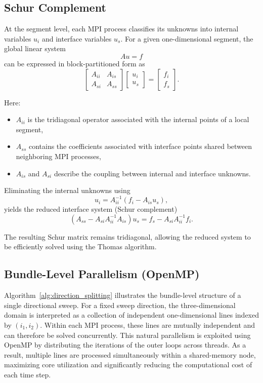 \documentclass[12pt]{article}
\begin{document}
\subsection{Schur Complement}

At the segment level, each MPI process classifies its unknowns into internal variables $u_i$ and interface variables $u_s$. For a given one-dimensional segment, the global linear system
\[
Au = f
\]
can be expressed in block-partitioned form as
\begin{equation}
    \begin{bmatrix}
        A_{ii} & A_{is} \\
        A_{si} & A_{ss}
    \end{bmatrix}
    \begin{bmatrix}
        u_i \\
        u_s
    \end{bmatrix}
    =
    \begin{bmatrix}
        f_i \\
        f_s
    \end{bmatrix}.
\end{equation}

Here:
\begin{itemize}
    \item $A_{ii}$ is the tridiagonal operator associated with the internal points of a local segment,
    \item $A_{ss}$ contains the coefficients associated with interface points shared between neighboring MPI processes,
    \item $A_{is}$ and $A_{si}$ describe the coupling between internal and interface unknowns.
\end{itemize}

Eliminating the internal unknowns using
\[
u_i = A_{ii}^{-1}(f_i - A_{is}u_s),
\]
yields the reduced interface system (Schur complement)
\begin{equation}
    (A_{ss} - A_{si}A_{ii}^{-1}A_{is})u_s
    =
    f_s - A_{si}A_{ii}^{-1}f_i.
\end{equation}

The resulting Schur matrix remains tridiagonal, allowing the reduced system to be efficiently solved using the Thomas algorithm.
\subsection{Bundle-Level Parallelism (OpenMP)}
Algorithm~\ref{alg:direction_splitting} illustrates the bundle-level structure of a single directional sweep. For a fixed sweep direction, the three-dimensional domain is interpreted as a collection of independent one-dimensional lines indexed by $(i_1,i_2)$. Within each MPI process, these lines are mutually independent and can therefore be solved concurrently. This natural parallelism is exploited using OpenMP by distributing the iterations of the outer loops across threads. As a result, multiple lines are processed simultaneously within a shared-memory node, maximizing core utilization and significantly reducing the computational cost of each time step.
\end{document}
